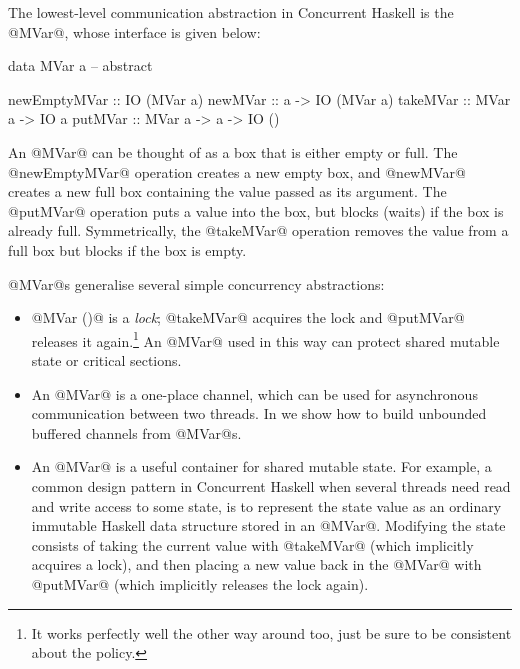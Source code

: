 
The lowest-level communication abstraction in Concurrent Haskell is
the @MVar@, whose interface is given below:

\begin{haskell}
data MVar a  -- abstract

newEmptyMVar :: IO (MVar a)
newMVar      :: a -> IO (MVar a)
takeMVar     :: MVar a -> IO a
putMVar      :: MVar a -> a -> IO ()
\end{haskell}

\noindent An @MVar@ can be thought of as a box that is either empty
or full. The @newEmptyMVar@ operation creates a new empty box, and @newMVar@ creates
a new full box containing the value passed as its argument.  The @putMVar@
operation puts a value into the box, but blocks (waits) if the box is
already full.  Symmetrically, the @takeMVar@ operation removes the value
from a full box but blocks if the box is empty.

@MVar@s generalise several simple concurrency abstractions:

\begin{itemize}
\item @MVar ()@ is a \emph{lock}; @takeMVar@ acquires the lock and
  @putMVar@ releases it again.\footnote{It works perfectly well the
    other way around too, just be sure to be consistent about the policy.}  An @MVar@ used in this way can protect
  shared mutable state or critical sections.

\item An @MVar@ is a one-place channel, which can be used for
  asynchronous communication between two threads.  In
   we show how to build unbounded buffered channels
  from @MVar@s.

\item An @MVar@ is a useful container for shared mutable state.  For
  example, a common design pattern in Concurrent Haskell when several
  threads need read and write access to some state, is to represent
  the state value as an ordinary immutable Haskell data structure
  stored in an @MVar@.  Modifying the state consists of taking the
  current value with @takeMVar@ (which implicitly acquires a lock),
  and then placing a new value back in the @MVar@ with @putMVar@
  (which implicitly releases the lock again).

\end{itemize}

